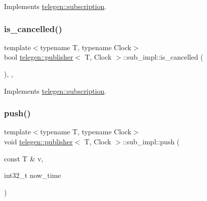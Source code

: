 Implements \hyperlink{classtelegen_1_1subscription_aca992d1891107380ec81a517ea0bde58}{telegen\+::subscription}.

\mbox{\label{classtelegen_1_1publisher_1_1sub__impl_a9880e80ac0b1887b5aec423abbc0a6f3}} 
\subsubsection{\texorpdfstring{is\+\_\+cancelled()}{is\_cancelled()}}
{\footnotesize\ttfamily template$<$typename T, typename Clock$>$ \\
bool \hyperlink{classtelegen_1_1publisher}{telegen\+::publisher}$<$ T, Clock $>$\+::sub\+\_\+impl\+::is\+\_\+cancelled (\begin{DoxyParamCaption}{ }\end{DoxyParamCaption})\hspace{0.3cm}{\ttfamily [inline]}, {\ttfamily [override]}, {\ttfamily [virtual]}}



Implements \hyperlink{classtelegen_1_1subscription_a4bbe4edbb2ecba3ccff4d6de562e2e7d}{telegen\+::subscription}.

\mbox{\label{classtelegen_1_1publisher_1_1sub__impl_a9d4f5e7d31c57067abccddeca51adbb0}} 
\subsubsection{\texorpdfstring{push()}{push()}}
{\footnotesize\ttfamily template$<$typename T, typename Clock$>$ \\
void \hyperlink{classtelegen_1_1publisher}{telegen\+::publisher}$<$ T, Clock $>$\+::sub\+\_\+impl\+::push (\begin{DoxyParamCaption}\item[{const T \&}]{v,  }\item[{int32\+\_\+t}]{now\+\_\+time }\end{DoxyParamCaption})\hspace{0.3cm}{\ttfamily [inline]}}

